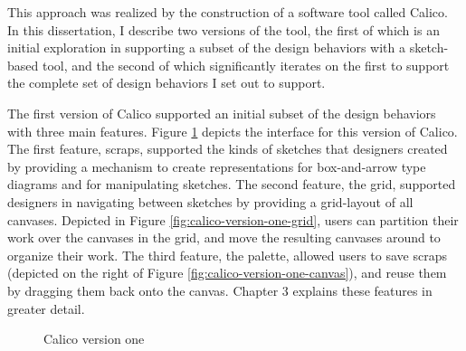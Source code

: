This approach was realized by the construction of a software tool called Calico. In this dissertation, I describe two versions of the tool, the first of which is an initial exploration in supporting a subset of the design behaviors with a sketch-based tool, and the second of which significantly iterates on the first to support the complete set of design behaviors I set out to support. 

The first version of Calico supported an initial subset of the design behaviors with three main features. Figure \ref{fig:calico-version-one} depicts the interface for this version of Calico. The first feature, scraps, supported the kinds of sketches that designers created by providing a mechanism to create representations for box-and-arrow type diagrams and for manipulating sketches. The second feature, the grid, supported designers in navigating between sketches by providing a grid-layout of all canvases. Depicted in Figure \ref{fig:calico-version-one-grid}, users can partition their work over the canvases in the grid, and move the resulting canvases around to organize their work. The third feature, the palette, allowed users to save scraps (depicted on the right of Figure \ref{fig:calico-version-one-canvas}), and reuse them by dragging them back onto the canvas. Chapter 3 explains these features in greater detail.

\begin{figure}
  \centering
   \caption {Calico version one}
   \label{fig:calico-version-one}
\end{figure}

